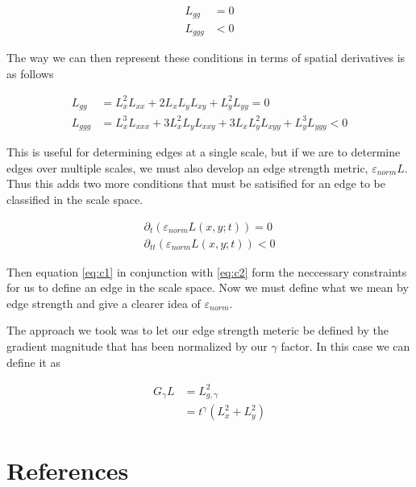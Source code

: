 \documentclass{article}
\begin{document}
    \begin{equation} \label{eq:c1}
        \begin{aligned}
            L_{gg} &= 0 \\ 
            L_{ggg} &< 0
        \end{aligned}
    \end{equation}

    The way we can then represent these conditions in terms of spatial derivatives is as follows

    \begin{equation}
        \begin{aligned}
            L_{gg} &= L_x^2L_{xx}+2L_xL_yL_{xy}+L_y^2L_{yy} = 0 \\
            L_{ggg} &= L_x^3L_{xxx} +3L_x^2L_yL_{xxy}+3L_xL_y^2L_{xyy}+L_y^3L_{yyy} < 0
        \end{aligned}
    \end{equation}

    This is useful for determining edges at a single scale, but if we are to determine edges over multiple scales, we must also develop an edge strength metric, $\varepsilon_{norm}L$. Thus this adds two more conditions that must be satisified for an edge to be classified in the scale space. 

    \begin{equation} \label{eq:c2}
        \begin{aligned}
            \partial_t(\varepsilon_{norm}L(x,y;t)) = 0\\
            \partial_{tt}(\varepsilon_{norm}L(x,y;t)) < 0
        \end{aligned}
    \end{equation}

    Then equation \ref{eq:c1} in conjunction with \ref{eq:c2} form the neccessary constraints for us to define an edge in the scale space. Now we must define what we mean by edge strength and give a clearer idea of $\varepsilon_{norm}$.

    The approach we took was to let our edge strength meteric be defined by the gradient magnitude that has been normalized by our $\gamma$ factor. In this case we can define it as 

    \begin{equation}
        \begin{aligned}
            G_{\gamma}L &= L_{g,\gamma}^2 \\
            &= t^{\gamma}(L_x^2+L_y^2)
        \end{aligned}
    \end{equation}

\section*{References}
\end{document}
